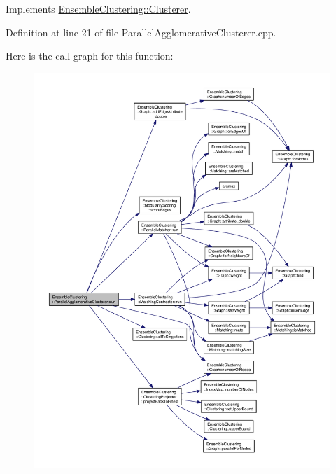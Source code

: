Implements \hyperlink{class_ensemble_clustering_1_1_clusterer_a9fab8db7082b6399e1d29509512cad91}{Ensemble\-Clustering\-::\-Clusterer}.



Definition at line 21 of file Parallel\-Agglomerative\-Clusterer.\-cpp.



Here is the call graph for this function\-:
\nopagebreak
\begin{figure}[H]
\begin{center}
\leavevmode
\includegraphics[width=350pt]{class_ensemble_clustering_1_1_parallel_agglomerative_clusterer_a7858e8e6b9110b6a0a59c3972709d606_cgraph}
\end{center}
\end{figure}


